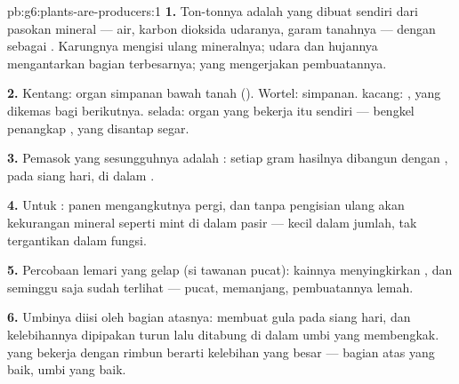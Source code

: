 \begin{solution}{pb:g6:plants-are-producers:1}
\textbf{1.} Ton-tonnya adalah  yang dibuat 
sendiri dari pasokan mineral --- air, karbon dioksida udaranya, garam
tanahnya --- dengan  sebagai . Karungnya mengisi ulang
mineralnya; udara dan hujannya mengantarkan bagian terbesarnya;
 yang mengerjakan pembuatannya.

\textbf{2.} Kentang: organ simpanan bawah tanah (). Wortel:
 simpanan.  kacang:  , yang dikemas
bagi  berikutnya.  selada: organ yang bekerja itu sendiri
--- bengkel penangkap , yang disantap segar.

\textbf{3.} Pemasok yang sesungguhnya adalah : setiap gram
hasilnya dibangun dengan  , pada siang hari, di dalam
.

\textbf{4.} Untuk : panen mengangkutnya pergi, dan
tanpa pengisian ulang  akan kekurangan mineral seperti 
mint di dalam pasir --- kecil dalam jumlah, tak tergantikan dalam
fungsi.

\textbf{5.} Percobaan lemari yang gelap (si tawanan pucat): kainnya
menyingkirkan , dan seminggu saja sudah terlihat --- pucat,
memanjang, pembuatannya lemah.

\textbf{6.} Umbinya diisi oleh bagian atasnya:  membuat gula
pada siang hari, dan kelebihannya dipipakan turun lalu ditabung di
dalam umbi yang membengkak.  yang bekerja dengan rimbun berarti
kelebihan yang besar --- bagian atas yang baik, umbi yang baik.


\end{solution}
